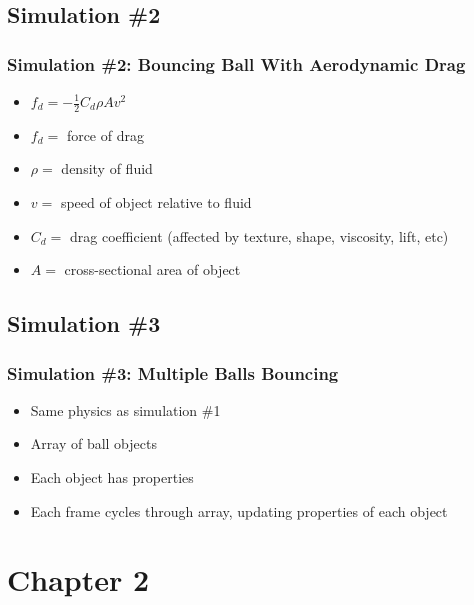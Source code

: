 \documentclass{beamer}
\begin{document}
\subsection{Simulation \#2}

\begin{frame}
\frametitle{Simulation \#2: Bouncing Ball With Aerodynamic Drag}

\begin{itemize}

\item $ 
f_{d} = -\frac{1}{2}C_d \rho A v^2
$

\vspace{1cm}
\item  $ f_d =   $ force of drag
\item $\rho = $ density of fluid
\item $v = $ speed of object relative to fluid
\item  $C_d = $ drag coefficient (affected by texture, shape, viscosity, lift, etc)  
\item $ A = $ cross-sectional area of object


\end{itemize}





\end{frame}




\subsection{Simulation \#3}

\begin{frame}
\frametitle{Simulation \#3: Multiple Balls Bouncing}

\begin{itemize}

\item Same physics as simulation \#1
\item Array of ball objects
\item Each object has properties
\item Each frame cycles through array, updating properties of each object


\end{itemize}

\end{frame}


\section{Chapter 2}
\end{document}
